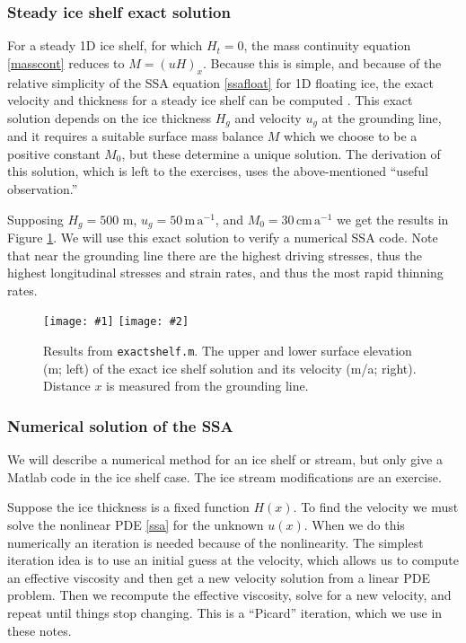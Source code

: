 \documentclass[titlepage,letterpaper,final,12pt]{scrartcl}
\newcommand{\twofigsizes}[5]{
\begin{figure}[ht]
\centering
\texttt{[image: \#1]} \quad
\texttt{[image: \#2]}
\caption{#3}
\label{fig:#1}
\end{figure}}
\newcommand{\twofig}[3]{\twofigsizes{#1}{#2}{#3}{2.5in}{2.5in}}
\begin{document}
\subsubsection*{Steady ice shelf exact solution}  For a steady 1D ice shelf, for which $H_t=0$, the mass continuity equation \eqref{masscont} reduces to $M=(uH)_x$.  Because this is simple, and because of the relative simplicity of the SSA equation \eqref{ssafloat} for 1D floating ice, the exact velocity and thickness for a steady ice shelf can be computed \cite{vanderVeen83}.  This exact solution depends on the ice thickness $H_g$ and velocity $u_g$ at the grounding line, and it requires a suitable surface mass balance $M$ which we choose to be a positive constant $M_0$, but these determine a unique solution.  The derivation of this solution, which is left to the exercises, uses the above-mentioned ``useful observation.''

Supposing $H_g=500$ m, $u_g = 50 \,\text{m}\,\text{a}^{-1}$, and $M_0=30 \,\text{cm}\,\text{a}^{-1}$ we get the results in Figure \ref{fig:steadyshelfprofile}.  We will use this exact solution to verify a numerical SSA code.  Note that near the grounding line there are the highest driving stresses, thus the highest longitudinal stresses and strain rates, and thus the most rapid thinning rates.

\twofig{steadyshelfprofile}{steadyshelfvelocity}{Results from \texttt{exactshelf.m}.  The upper and lower surface elevation (m; left) of the exact ice shelf solution and its velocity (m/a; right).  Distance $x$ is measured from the grounding line.}

\subsubsection*{Numerical solution of the SSA}  We will describe a numerical method for an ice shelf or stream, but only give a Matlab code in the ice shelf case.  The ice stream modifications are an exercise.

Suppose the ice thickness is a fixed function $H(x)$.  To find the velocity we must solve the nonlinear PDE \eqref{ssa} for the unknown $u(x)$.  When we do this numerically an iteration is needed because of the nonlinearity.  The simplest iteration idea is to use an initial guess at the velocity, which allows us to compute an effective viscosity and then get a new velocity solution from a linear PDE problem.  Then we recompute the effective viscosity, solve for a new velocity, and repeat until things stop changing.  This is a ``Picard'' iteration, which we use in these notes.
\end{document}
